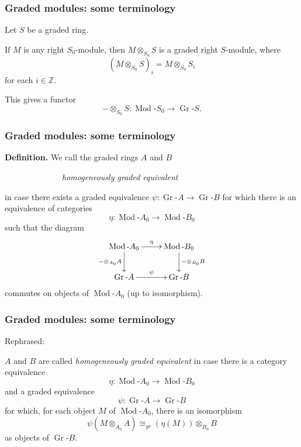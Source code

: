 \documentclass{beamer}
\newcommand{\rmod}[1]{\operatorname{Mod}\text{-}#1}
\newcommand{\grmod}[1]{\operatorname{Gr}\text{-}#1}
\newcommand{\hgr}{\operatorname{hgr}}
\begin{document}
\begin{frame}
\frametitle{Graded modules:  some terminology}
 
Let $S$ be a graded ring.

\medskip


If $M$ is any right $S_0$-module, then 
$M \otimes_{S_0} S$
is a graded right $S$-module, where
$$(M \otimes_{S_0} S)_i = M \otimes_{S_0} S_i$$
 for each $i \in \mathbb{Z}$.  

\medskip

This gives a functor
$$ -  \otimes_{S_0} S : \rmod{S_0} \to \grmod{S}.$$



\end{frame}




\begin{frame}
\frametitle{Graded modules:  some terminology}
 



{\bf Definition.}      We  call the graded rings $A$ and $B$

\smallskip
\ \ \ \ \ \ \ \ \ \ \ \ \ \  {\it homogeneously graded equivalent}
 \smallskip
 
  in case there exists  a graded equivalence $\psi: \grmod{A} \to \grmod{B}$ 
for which there is an equivalence  of categories
$$\eta: \rmod{A_0} \to \rmod{B_0}$$
such that the diagram
$$  \xymatrix{\rmod{A_0} \ar[d]_{- \otimes_{A_0}A}\ar[r]^\eta&\rmod{B_0} \ar[d]^{- \otimes_{B_0}B}\\
\grmod{A}\ar[r]^\psi &\grmod{B}  }$$
\noindent
commutes  on objects of $\rmod{A_0}$ (up to isomorphism).  




\end{frame}



\begin{frame}
\frametitle{Graded modules:  some terminology}
 


Rephrased:    

\bigskip

 $A$ and $B$ are called {\it homogeneously graded equivalent} in case  there is a category equivalence $$\eta: \rmod{A_0} \to \rmod{B_0}$$  and a graded equivalence  $$\psi: \grmod{A} \to \grmod{B}$$   for which, for each object $M$ of $\rmod{A_0}$, there is an isomorphism  
 $$\psi(M\otimes_{A_0}A) \cong_{gr} (\eta(M))\otimes_{B_0}B$$ as objects of $\grmod{B}$. 
 
 \medskip
 

\



\end{frame}
\end{document}
